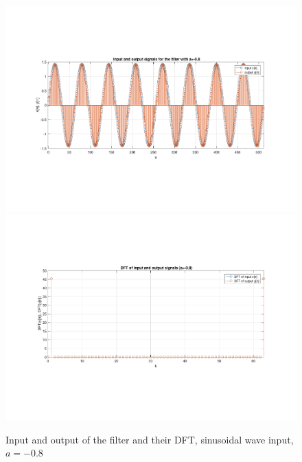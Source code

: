 \begin{figure} [H]
	\centering
	\includegraphics[trim={2.5cm 5cm 2.5cm 5cm}, clip, width=0.75\linewidth]{io_sin_2}
	\includegraphics[trim={2.5cm 5cm 2.5cm 5cm}, clip, width=0.75\linewidth]{dft_sin_2}
	\caption{Input and output of the filter and their DFT, sinusoidal wave input, $a=-0.8$}
	\label{fig:t1_io_sin_2}
\end{figure}
